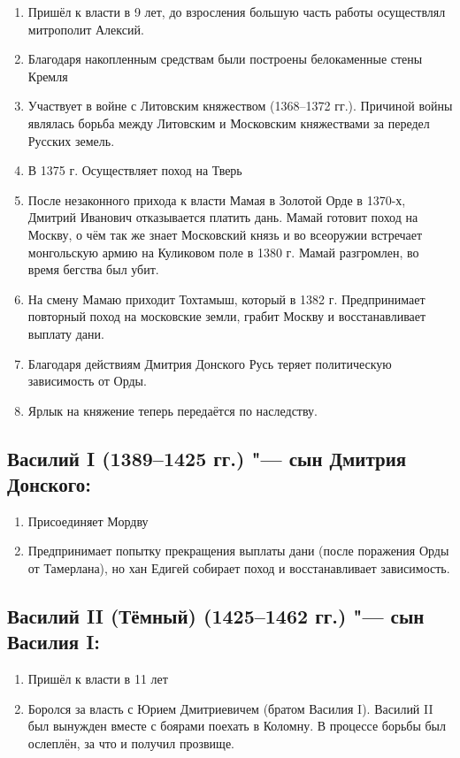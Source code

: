 \begin{enumerate}
    \item{ Пришёл к власти в 9 лет, до взросления большую часть работы осуществлял митрополит Алексий.}
    \item{ Благодаря накопленным средствам были построены белокаменные стены Кремля}
    \item{ Участвует в войне с Литовским княжеством (1368--1372 гг.). Причиной войны являлась борьба между Литовским и Московским княжествами за передел Русских земель.}
    \item{ В 1375 г. Осуществляет поход на Тверь}
    \item{ После незаконного прихода к власти Мамая в Золотой Орде в 1370-х, Дмитрий Иванович отказывается платить дань. Мамай готовит поход на Москву, о чём так же знает Московский князь и во всеоружии встречает монгольскую армию на Куликовом поле в 1380 г. Мамай разгромлен, во время бегства был убит.}
    \item{ На смену Мамаю приходит Тохтамыш, который в 1382 г. Предпринимает повторный поход на московские земли, грабит Москву и восстанавливает выплату дани.}
    \item{ Благодаря действиям Дмитрия Донского Русь теряет политическую зависимость от Орды.}
    \item{ Ярлык на княжение теперь передаётся по наследству.}
\end{enumerate}

\subsection{Василий I (1389--1425 гг.) "--- сын Дмитрия Донского:}

\begin{enumerate}
    \item{ Присоединяет Мордву}
    \item{ Предпринимает попытку прекращения выплаты дани (после поражения Орды от Тамерлана), но хан Едигей собирает поход и восстанавливает зависимость.}
\end{enumerate}

\subsection{Василий II (Тёмный) (1425--1462 гг.) "--- сын Василия I:}

\begin{enumerate}
    \item{ Пришёл к власти в 11 лет}
    \item{ Боролся за власть с Юрием Дмитриевичем (братом Василия I). Василий II был вынужден вместе с боярами поехать в Коломну. В процессе борьбы был ослеплён, за что и получил прозвище.}
\end{enumerate}
